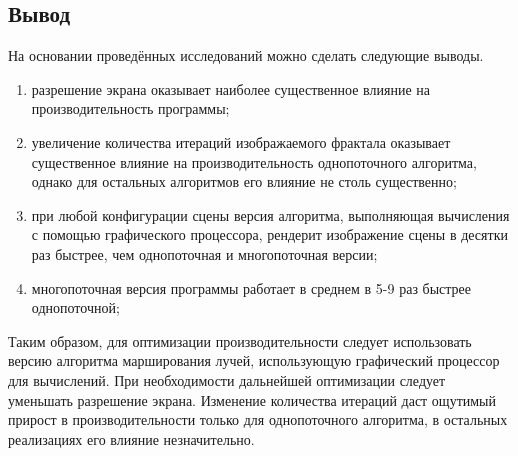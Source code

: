 \clearpage

\subsection{Вывод}
На основании проведённых исследований можно сделать следующие выводы.

\begin{enumerate}
  \item разрешение экрана оказывает наиболее существенное влияние на производительность программы;
  \item увеличение количества итераций изображаемого фрактала оказывает существенное влияние на производительность
    однопоточного алгоритма, однако для остальных алгоритмов его влияние не столь существенно;
  \item при любой конфигурации сцены версия алгоритма, выполняющая вычисления с помощью графического процессора,
    рендерит изображение сцены в десятки раз быстрее, чем однопоточная и многопоточная версии;
  \item многопоточная версия программы работает в среднем в 5-9 раз быстрее однопоточной;
\end{enumerate}

Таким образом, для оптимизации производительности следует использовать версию алгоритма марширования лучей,
использующую графический процессор для вычислений. При необходимости дальнейшей оптимизации
следует уменьшать разрешение экрана. Изменение количества итераций даст ощутимый прирост в производительности только
для однопоточного алгоритма, в остальных реализациях его влияние незначительно.
